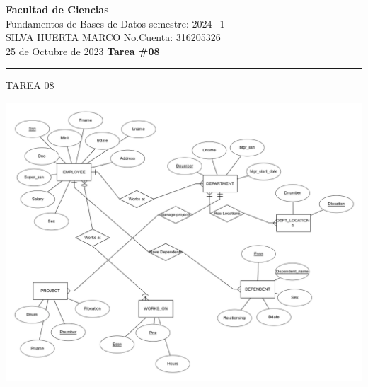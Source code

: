 \documentclass[a4paper,12pt]{article}
\begin{document}
\pagecolor{black}
\color{white}

\thispagestyle{firstpage} %
\noindent
\large\textbf{Facultad de Ciencias} \\
Fundamentos de Bases de Datos \hfill semestre: 2024$-$1 \\
\textsc{SILVA HUERTA MARCO}   \hfill No.Cuenta: 316205326    \\
25 de Octubre de 2023      \hfill \textbf{Tarea \#08}    \\
\noindent\rule{7.3in}{2.8pt}

\begin{center}
\textcolor{sun}{\Large{TAREA 08}}
\end{center}


\begin{center}
    \includegraphics[scale = .5]{IMA/image.png}
\end{center}






\end{document}
